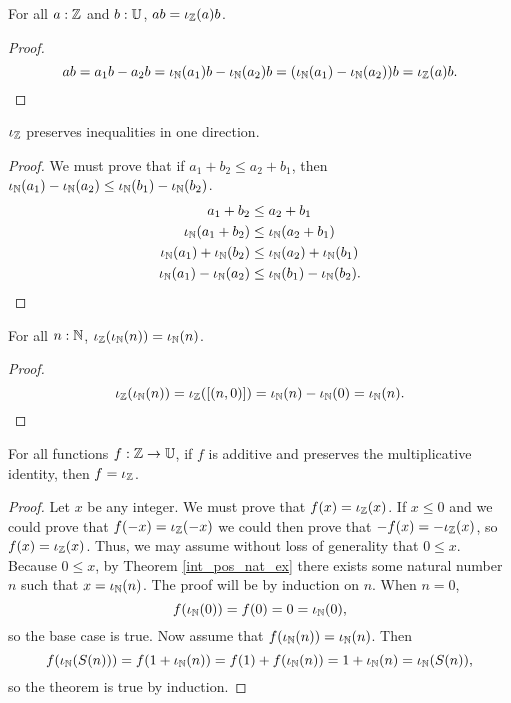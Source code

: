 \documentclass[../../math.tex]{subfiles}
\begin{document}
\begin{theorem}
    For all $a : \mathbb{Z}$ and $b : \mathbb{U}$, $ab = \iota_{\mathbb{Z}}(a)b$.
\end{theorem}
\begin{proof}
    \[
        ab = a_1b - a_2b = \iota_{\mathbb{N}}(a_1)b - \iota_{\mathbb{N}}(a_2)b = (\iota_{\mathbb{N}}(a_1) - \iota_{\mathbb{N}}(a_2))b
        = \iota_{\mathbb{Z}}(a)b.
    \]
\end{proof}

\begin{instance}
    $\iota_{\mathbb{Z}}$ preserves inequalities in one direction.
\end{instance}
\begin{proof}
    We must prove that if $a_1 + b_2 \leq a_2 + b_1$, then $\iota_{\mathbb{N}}(a_1) - \iota_{\mathbb{N}}(a_2)
    \leq \iota_{\mathbb{N}}(b_1) - \iota_{\mathbb{N}}(b_2)$.
    \begin{align*}
        a_1 + b_2 &\leq a_2 + b_1 \\
        \iota_{\mathbb{N}}(a_1 + b_2) &\leq \iota_{\mathbb{N}}(a_2 + b_1) \\
        \iota_{\mathbb{N}}(a_1) + \iota_{\mathbb{N}}(b_2) &\leq \iota_{\mathbb{N}}(a_2) + \iota_{\mathbb{N}}(b_1) \\
        \iota_{\mathbb{N}}(a_1) - \iota_{\mathbb{N}}(a_2) &\leq \iota_{\mathbb{N}}(b_1) - \iota_{\mathbb{N}}(b_2).
    \end{align*}
\end{proof}

\begin{theorem}
    For all $n : \mathbb{N}$, $\iota_{\mathbb{Z}}(\iota_{\mathbb{N}}(n)) = \iota_{\mathbb{N}}(n)$.
\end{theorem}
\begin{proof}
    \[
        \iota_{\mathbb{Z}}(\iota_{\mathbb{N}}(n)) = \iota_{\mathbb{Z}}([(n, 0)]) = \iota_{\mathbb{N}}(n) - \iota_{\mathbb{N}}(0) = \iota_{\mathbb{N}}(n).
    \]
\end{proof}

\begin{theorem} \label{from_int_unique}
    For all functions $f : \mathbb{Z} \to \mathbb{U}$, if $f$ is additive and preserves the
    multiplicative identity, then $f = \iota_{\mathbb{Z}}$.
\end{theorem}
\begin{proof}
    Let $x$ be any integer.  We must prove that $f(x) = \iota_{\mathbb{Z}}(x)$.  If $x \leq 0$
    and we could prove that $f(-x) = \iota_{\mathbb{Z}}(-x)$ we could then prove that $-f(x) =
    -\iota_{\mathbb{Z}}(x)$, so $f(x) = \iota_{\mathbb{Z}}(x)$.  Thus, we may assume without loss of
    generality that $0 \leq x$.  Because $0 \leq x$, by Theorem
    \ref{int_pos_nat_ex} there exists some natural number $n$ such that $x =
    \iota_{\mathbb{N}}(n)$.  The proof will be by induction on $n$.  When $n = 0$,
    \[
        f(\iota_{\mathbb{N}}(0)) = f(0) = 0 = \iota_{\mathbb{N}}(0),
    \]
    so the base case is true.  Now assume that $f(\iota_{\mathbb{N}}(n)) = \iota_{\mathbb{N}}(n)$.  Then
    \[
        f(\iota_{\mathbb{N}}(S(n))) = f(1 + \iota_{\mathbb{N}}(n)) = f(1) + f(\iota_{\mathbb{N}}(n)) = 1 + \iota_{\mathbb{N}}(n) =
        \iota_{\mathbb{N}}(S(n)),
    \]
    so the theorem is true by induction.
\end{proof}
\end{document}
